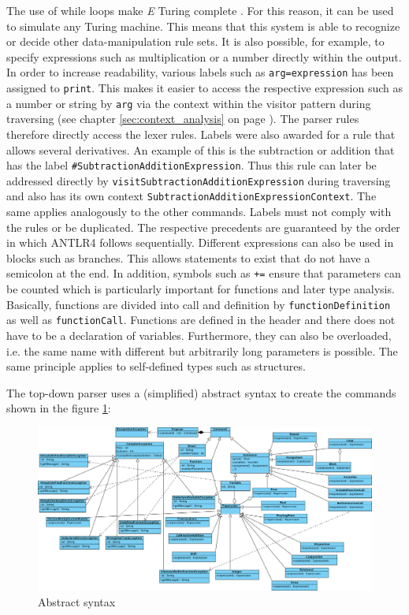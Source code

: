 The use of while loops make \emph{E} Turing complete \cite{z2018}. For this reason, it can be used to simulate any Turing machine. This means that this system is able to recognize or decide other data-manipulation rule sets. It is also possible, for example, to specify expressions such as multiplication or a number directly within the output. In order to increase readability, various labels such as \texttt{arg=expression} has been assigned to \texttt{print}. This makes it easier to access the respective expression such as a number or string by \texttt{arg} via the context within the visitor pattern during traversing (see chapter \ref{sec:context_analysis} on page \pageref{sec:context_analysis}). The parser rules therefore directly access the lexer rules. Labels were also awarded for a rule that allows several derivatives. An example of this is the subtraction or addition that has the label \texttt{\#SubtractionAdditionExpression}. Thus this rule can later be addressed directly by \texttt{visitSubtractionAdditionExpression} during traversing and also has its own context \texttt{SubtractionAdditionExpressionContext}. The same applies analogously to the other commands. Labels must not comply with the rules or be duplicated. The respective precedents are guaranteed by the order in which ANTLR4 follows sequentially. Different expressions can also be used in blocks such as branches. This allows statements to exist that do not have a semicolon at the end. In addition, symbols such as \texttt{+=} ensure that parameters can be counted which is particularly important for functions and later type analysis. Basically, functions are divided into call and definition by \texttt{functionDefinition} as well as \texttt{functionCall}. Functions are defined in the header and there does not have to be a declaration of variables. Furthermore, they can also be overloaded, i.e. the same name with different but arbitrarily long parameters is possible. The same principle applies to self-defined types such as structures.

The top-down parser uses a (simplified) abstract syntax to create the commands shown in the figure \ref{fig:abstract_syntax}:

\begin{figure}[bth]
	\centering
	\includegraphics[scale=0.44]{./img/abstract_syntax}
	\caption[Abstract syntax]{Abstract syntax}
	\label{fig:abstract_syntax}
\end{figure}
\noindent

